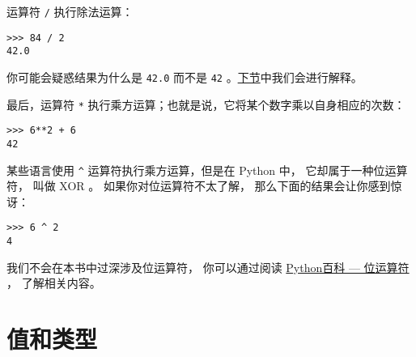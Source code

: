 %

运算符 \lstinline{/} 执行除法运算：


\begin{lstlisting}
>>> 84 / 2
42.0
\end{lstlisting}

%

你可能会疑惑结果为什么是 \lstinline{42.0} 而不是 \lstinline{42} 。\hyperref[value_types]{下节}中我们会进行解释。


最后，运算符 \lstinline{*} 执行乘方运算；也就是说，它将某个数字乘以自身相应的次数：

\begin{lstlisting}
>>> 6**2 + 6
42
\end{lstlisting}


%

某些语言使用 \lstinline{^} 运算符执行乘方运算，但是在 Python 中， 它却属于一种位运算符， 叫做 XOR 。 如果你对位运算符不太了解， 那么下面的结果会让你感到惊讶：

\begin{lstlisting}
>>> 6 ^ 2
4
\end{lstlisting}

%

我们不会在本书中过深涉及位运算符， 你可以通过阅读 \href{http://wiki.python.org/moin/BitwiseOperators}{Python百科 --- 位运算符} ， 了解相关内容。
  
  


\section{值和类型}
    
    
\label{value_types}

